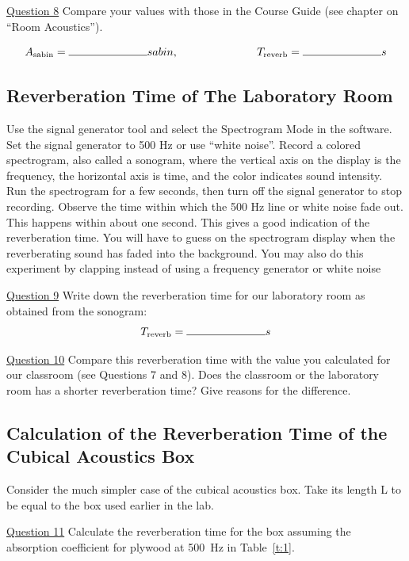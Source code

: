 \documentclass[11pt]{NSF}
\begin{document}
\underline{Question 8} Compare your values with those in the Course Guide (see chapter 
on ``Room Acoustics”).

\[A_{\rm sabin} = \rule{2.5cm}{0.15mm}sabin, \rule{2.5cm}{0.0mm} T_{\rm reverb} = \rule{2.5cm}{0.15mm}s\]

\subsection{Reverberation Time of The Laboratory Room}

Use the signal generator tool and select the Spectrogram Mode in the software. Set the signal
generator to 500 Hz or use “white noise”. Record a colored spectrogram, also called a sonogram,
where the vertical axis on the display is the frequency, the horizontal axis is time, and the color
indicates sound intensity. Run the spectrogram for a few seconds, then turn off the signal
generator to stop recording. Observe the time within which the 500 Hz line or white noise fade
out. This happens within about one second. This gives a good indication of the reverberation
time. You will have to guess on the spectrogram display when the reverberating sound has faded
into the background. You may also do this experiment by clapping instead of using a frequency
generator or white noise

\underline{Question 9} Write down the reverberation time for our laboratory room as obtained from the sonogram:
\[T_{\rm reverb} = \rule{2.5cm}{0.15mm}s\]

\underline{Question 10} Compare this reverberation time with the value you calculated for our classroom (see
Questions 7 and 8). Does the classroom or the laboratory room has a shorter reverberation time?
Give reasons for the difference.



\subsection{Calculation of the Reverberation Time of the
Cubical Acoustics Box}

Consider the much simpler case of the cubical acoustics box. 
Take its length L to be equal to the box used earlier in the lab.


\underline{Question 11} Calculate the reverberation time for the box 
assuming the absorption coefficient for plywood at 500~Hz 
in Table~\ref{t:1}.
\\
\\
\\
\\
\\
\end{document}
